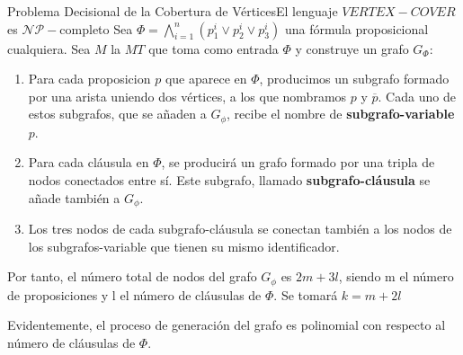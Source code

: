 \documentclass[10pt, envcountsect, presentation, aspectratio=169]{beamer}
\begin{document}
\begin{frame}{Problema Decisional de la Cobertura de Vértices}{El lenguaje $VERTEX-COVER$ es $\mathcal{NP}-$completo }
    Sea $\Phi=\bigwedge_{i=1}^n(p_1^i \vee p_2^i \vee p_3^i)$ una fórmula proposicional cualquiera. Sea $M$ la $MT$ que toma como entrada $\Phi$ y construye un grafo $G_\Phi$:
    \begin{enumerate}
        \item Para cada proposicion $p$ que aparece en $\Phi$, producimos un subgrafo formado por una arista uniendo dos vértices, a los que nombramos $p$ y $\overline{p}$. Cada uno de estos subgrafos, que se añaden a $G_\phi$, recibe el nombre de \textbf{subgrafo-variable }$p$.

        \item Para cada cláusula en $\Phi$, se producirá un grafo formado por una tripla de nodos conectados entre sí. Este subgrafo, llamado \textbf{subgrafo-cláusula} se añade también a $G_\phi$.

        \item Los tres nodos de cada subgrafo-cláusula se conectan también a los nodos de los subgrafos-variable que tienen su mismo identificador.
    \end{enumerate}
    Por tanto, el número total de nodos del grafo $G_\phi$ es $2m + 3l$, siendo m el número de proposiciones y l el número de cláusulas de $\Phi$. Se tomará $k = m + 2l$

    Evidentemente, el proceso de generación del grafo es polinomial con respecto al número de cláusulas de $\Phi$.
\end{frame}
\end{document}
